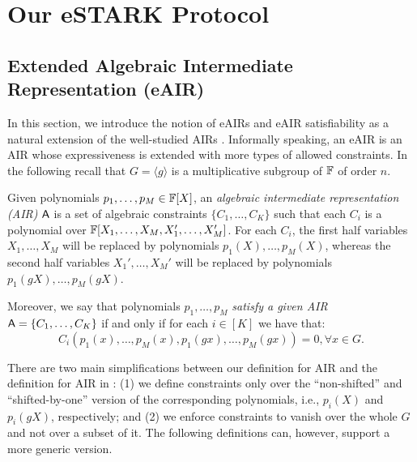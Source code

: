 

\section{Our eSTARK Protocol}\label{sec:generic-description}

\subsection{Extended Algebraic Intermediate Representation (eAIR)} \label{sec:eAIR}

In this section, we introduce the notion of eAIRs and eAIR satisfiability as a natural extension of the well-studied AIRs \cite{C:BBHR19}. Informally speaking, an eAIR is an AIR whose expressiveness is extended with more types of allowed constraints. In the following recall that $G = \langle g \rangle$ is a multiplicative subgroup of $\mathbb{F}$ of order $n$.

\begin{definition}\label{def:AIR}
  Given polynomials $p_1,\dots,p_M \in \mathbb{F}[X]$, an \textit{algebraic intermediate representation (AIR)} $\textsf{A}$ is a set of algebraic constraints $\{C_1,\dots,C_K\}$ such that each $C_i$ is a polynomial over $\mathbb{F}[X_1,\dots,X_M,X_1',\dots,X_M']$. For each $C_i$, the first half variables $X_1,\dots,X_M$ will be replaced by polynomials $p_1(X),\dots,p_M(X)$, whereas the second half variables $X_1',\dots,X_M'$ will be replaced by polynomials $p_1(gX),\dots,p_M(gX)$.

  Moreover, we say that polynomials $p_1,\dots,p_M$ \textit{satisfy a given AIR} $\textsf{A} = \{C_1,\dots,C_K\}$ if and only if for each $i \in [K]$ we have that:
  \[
    C_i(p_1(x),\dots,p_M(x),p_1(gx),\dots,p_M(gx)) = 0, \forall x \in G.
  \]
\end{definition}
\begin{bremark}
  There are two main simplifications between our definition for AIR and the definition for AIR in \cite{EPRINT:StarkWare21}: (1) we define constraints only over the ``non-shifted'' and ``shifted-by-one'' version of the corresponding polynomials, i.e., $p_i(X)$ and $p_i(gX)$, respectively; and (2) we enforce constraints to vanish over the whole $G$ and not over a subset of it. The following definitions can, however, support a more generic version. 
\end{bremark}


